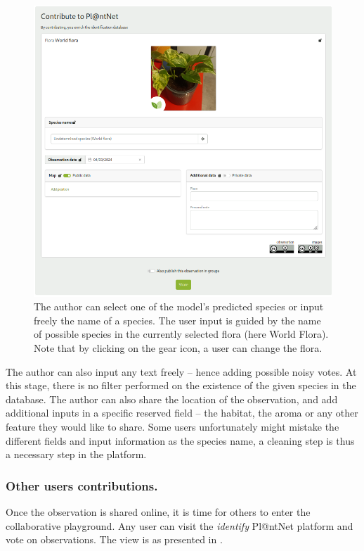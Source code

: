         \begin{figure}[tbh]
        \centering
        \includegraphics[width=.65\textwidth]{./images_plantnet/free_sharing_pothos.png}
        \caption{The author can select one of the model's predicted species or input freely the name of a species. The user input is guided by the name of possible species in the currently selected flora (here World Flora). Note that by clicking on the gear icon, a user can change the flora.}
        \label{fig:pothos_sharing}
        \end{figure}

The author can also input any text freely -- hence adding possible noisy votes.
At this stage, there is no filter performed on the existence of the given species in the database.
The author can also share the location of the observation, and add additional inputs in a specific reserved field -- the habitat, the aroma or any other feature they would like to share.
Some users unfortunately might mistake the different fields and input information as the species name, a cleaning step is thus a necessary step in the platform.

\subsubsection{Other users contributions.}

Once the observation is shared online, it is time for others to enter the collaborative playground.
Any user can visit the \emph{identify} Pl@ntNet platform and vote on observations.
The view is as presented in .

